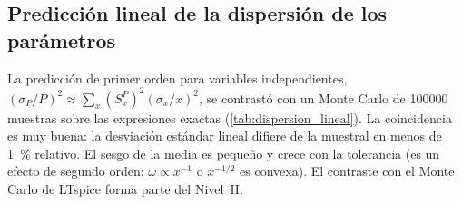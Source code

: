 \subsection{Predicción lineal de la dispersión de los parámetros}
La predicción de primer orden para variables independientes, $(\sigma_P/P)^2 \approx \sum_x (S^P_x)^2(\sigma_x/x)^2$, se contrastó con un Monte
Carlo de \num{100000} muestras sobre las expresiones exactas (\cref{tab:dispersion_lineal}). La coincidencia es muy buena: la desviación estándar
lineal difiere de la muestral en menos de \qty{1}{\percent} relativo. El sesgo de la media es pequeño y crece con la tolerancia (es un efecto de
segundo orden: $\omega \propto x^{-1}$ o $x^{-1/2}$ es convexa). El contraste con el Monte Carlo de LTspice forma parte del Nivel~II.

\begin{table}[H]
  \centering\small
  \caption{Dispersión relativa de $\omega_r$, $\omega_0$ y $Q$: predicción lineal frente a Monte Carlo ($R$: $\pm\qty{1}{\percent}$, uniforme).}
  \label{tab:dispersion_lineal}
\end{table}
